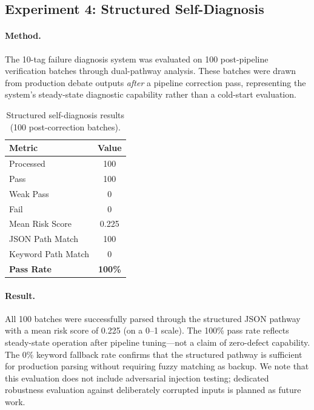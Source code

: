 \documentclass[11pt,a4paper]{article}
\begin{document}
\subsection{Experiment 4: Structured Self-Diagnosis}

\paragraph{Method.} The 10-tag failure diagnosis system was evaluated on 100 post-pipeline
verification batches through dual-pathway analysis. These batches were drawn from
production debate outputs \emph{after} a pipeline correction pass, representing the
system's steady-state diagnostic capability rather than a cold-start evaluation.

\begin{table}[h]
\centering
\caption{Structured self-diagnosis results (100 post-correction batches).}
\label{tab:exp4}
\small
\begin{tabular}{@{}lc@{}}
\toprule
\textbf{Metric} & \textbf{Value} \\
\midrule
Processed          & 100 \\
Pass               & 100 \\
Weak Pass          & 0 \\
Fail               & 0 \\
Mean Risk Score    & 0.225 \\
JSON Path Match    & 100 \\
Keyword Path Match & 0 \\
\textbf{Pass Rate} & \textbf{100\%} \\
\bottomrule
\end{tabular}
\end{table}

\paragraph{Result.} All 100 batches were successfully parsed through the structured JSON
pathway with a mean risk score of 0.225 (on a 0--1 scale). The 100\% pass rate reflects
steady-state operation after pipeline tuning---not a claim of zero-defect capability.
The 0\% keyword fallback rate confirms that the structured pathway is sufficient for
production parsing without requiring fuzzy matching as backup. We note that this
evaluation does not include adversarial injection testing; dedicated robustness evaluation
against deliberately corrupted inputs is planned as future work.
\end{document}
